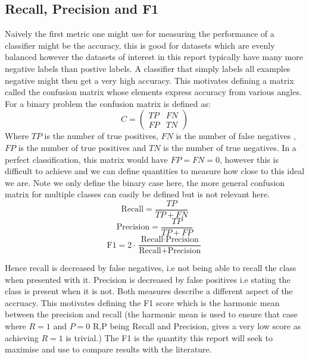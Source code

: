     \subsection{Recall, Precision and F1}
      Naively the first metric one might use for measuring the performance of a classifier
      might be the accuracy, this is good for datasets which are evenly balanced however
      the datasets of interest in this report typically have many more negative labels than postive labels.
      A classifier that simply labels all examples negative might then get a very high accuracy. This motivates
      defining a matrix called the confusion matrix whose elements express accuracy from various angles.
      For a binary problem the confusion matrix is defined as:
      \begin{equation}
        C =
        \begin{pmatrix}
          TP & FN\\
          FP & TN
        \end{pmatrix}
      \end{equation}
      Where $TP$ is the number of true positives, $FN$ is the number of false negatives
      , $FP$ is the number of true positives and $TN$ is the number of true negatives.
      In a perfect classification, this matrix would have $FP=FN=0$, however this is
      difficult to achieve
      and we can define quantities to measure how close to this ideal we are. Note we
      only define the binary case here, the more general confusion matrix for multiple
      classes can easily be defined but is not relevant here.
      \begin{equation}
        \text{Recall} = \frac{TP}{TP+FN}
      \end{equation}
      \begin{equation}
        \text{Precision} = \frac{TP}{TP+FP}
      \end{equation}
      \begin{equation}
        \text{F1} = 2 \cdot \frac{\text{Recall} \cdot \text{Precision}}{\text{Recall} + \text{Precision}}
      \end{equation}

      Hence recall is decreased by false negatives, i.e not being able to recall the class
      when presented with it. Precision is decreased by false positives i.e stating the class
      is present when it is not. Both measures describe a different aspect of the accruacy. This
      motivates defining the F1 score which is the harmonic mean between the precision and recall
      (the harmonic mean is used to ensure that case where $R=1$ and $P=0$ R,P being Recall and Precision, gives
      a very low score  as achieving $R=1$ is trivial.) The F1 is the quantity this report will seek to maximise and use to compare
      results with the literature.
